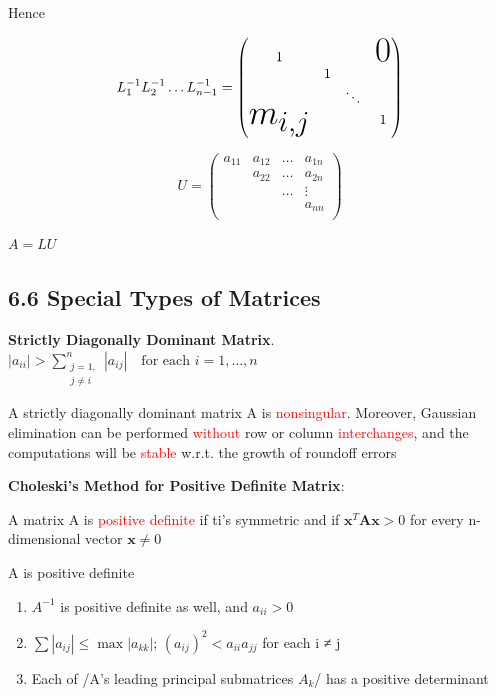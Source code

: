 \documentclass[11pt]{article}
\begin{document}
Hence 

\begin{equation*}
L_1^{-1}L_2^{-1}\dots L_{n-1}^{-1}=
\begin{pmatrix}
1&&&\mbox{\Huge 0}\\
&1&&\\
&&\ddots&\\
\text{\Huge $m_{i,j}$}&&&1\\
\end{pmatrix}
\end{equation*}

\begin{equation*}
U=
\begin{pmatrix}
a_{11}&a_{12}&\dots&a_{1n}\\
&a_{22}&\dots&a_{2n}\\
&&\dots&\vdots\\
&&&a_{nn}\\
\end{pmatrix}
\end{equation*}

\(A=LU\)
\subsection{6.6 Special Types of Matrices}
\label{sec:org282b5d9}
\textbf{Strictly Diagonally Dominant Matrix}.
\(|a_{ii}|>\displaystyle\sum_{\substack{j=1,\\j\neq i}}^n|a_{ij}| \quad
   \text{for each } i=1,\dots,n\)

\begin{theorem}
A strictly diagonally dominant matrix A is \textcolor{red}{nonsingular}. Moreover,
Gaussian elimination can be performed \textcolor{red}{without} row or column
\textcolor{red}{interchanges}, and the computations will be \textcolor{red}{stable}
w.r.t. the growth of roundoff errors
\end{theorem}

\textbf{Choleski's Method for Positive Definite Matrix}:
\begin{definition}
A matrix A is \textcolor{red}{positive definite} if ti's symmetric and if    
$ \mathbf{x}^T \mathbf{A} \mathbf{x}>0$ for every n-dimensional vector $ \mathbf{x}\neq 0$
\end{definition}

\begin{lemma}
A is positive definite
\begin{enumerate}
\item $A^{-1}$ is positive definite as well, and $a_{ii}>0$
\item $\sum|a_{ij}|\le\max|a_{kk}|$; $(a_{ij})^2<a_{ii}a_{jj}$ for each i ≠ j
\item Each of /A's leading principal submatrices $A_k$/ has a positive determinant
\end{enumerate}
\end{lemma}
\end{document}
